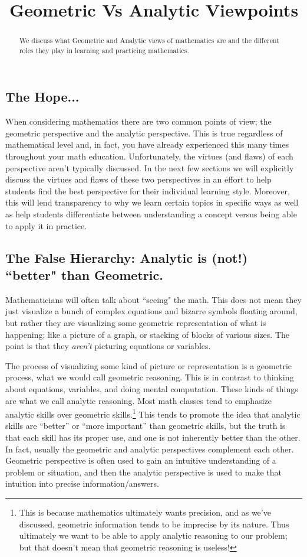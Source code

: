 \documentclass{ximera}
\title{Geometric Vs Analytic Viewpoints}
\begin{document}
\begin{abstract}
    We discuss what Geometric and Analytic views of mathematics are and the different roles they play in learning and practicing mathematics.
\end{abstract}
\maketitle

\subsection*{The Hope...}

    When considering mathematics there are two common points of view; the geometric perspective and the analytic perspective. This is true regardless of mathematical level and, in fact, you have already experienced this many times throughout your math education. Unfortunately, the virtues (and flaws) of each perspective aren't typically discussed. In the next few sections we will explicitly discuss the virtues and flaws of these two perspectives in an effort to help students find the best perspective for their individual learning style. Moreover, this will lend transparency to why we learn certain topics in specific ways as well as help students differentiate between understanding a concept versus being able to apply it in practice.

\subsection*{The False Hierarchy: Analytic is (not!) ``better" than Geometric.}

    Mathematicians will often talk about ``seeing" the math. This does not mean they just visualize a bunch of complex equations and bizarre symbols floating around, but rather they are visualizing some geometric representation of what is happening; like a picture of a graph, or stacking of blocks of various sizes. The point is that they \textit{aren't} picturing equations or variables.
    
    The process of visualizing some kind of picture or representation is a geometric process, what we would call geometric reasoning. This is in contrast to thinking about equations, variables, and doing mental computation. These kinds of things are what we call analytic reasoning. Most math classes tend to emphasize analytic skills over geometric skills.\footnote{This is because mathematics ultimately wants precision, and as we've discussed, geometric information tends to be imprecise by its nature. Thus ultimately we want to be able to apply analytic reasoning to our problem; but that doesn't mean that geometric reasoning is useless!} This tends to promote the idea that analytic skills are ``better'' or ``more important'' than geometric skills, but the truth is that each skill has its proper use, and one is not inherently better than the other. In fact, usually the geometric and analytic perspectives complement each other. Geometric perspective is often used to gain an intuitive understanding of a problem or situation, and then the analytic perspective is used to make that intuition into precise information/answers.
\end{document}
